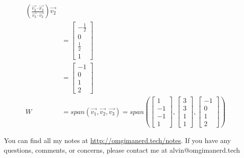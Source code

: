 \documentclass{math}
\begin{document}
\begin{align*}
    \left(\frac{\vec{v_2}\cdot\vec{x_3}}
    {\vec{v_2}\cdot\vec{v_2}}\right)\vec{v_2} \\
  &= \begin{bmatrix}-\frac{1}{2} \\ 0 \\ \frac{1}{2} \\ 1\end{bmatrix} \\
  &= \begin{bmatrix}-1 \\ 0 \\ 1 \\ 2\end{bmatrix} \\
  W &= span(\vec{v_1},\vec{v_2},\vec{v_3}) = span\left(
    \begin{bmatrix}1 \\ -1 \\ -1 \\ 1\end{bmatrix},
    \begin{bmatrix}3 \\ 3 \\ 1 \\ 1\end{bmatrix},
    \begin{bmatrix}-1 \\ 0 \\ 1 \\ 2\end{bmatrix}
  \right)
\end{align*}

\begin{center}
  You can find all my notes at \url{http://omgimanerd.tech/notes}. If you have
  any questions, comments, or concerns, please contact me at
  alvin@omgimanerd.tech
\end{center}
\end{document}

